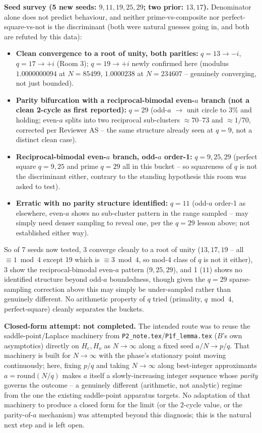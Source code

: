 \textbf{Seed survey (5 new seeds: $9,11,19,25,29$; two prior: $13,17$).} Denominator alone does
not predict behaviour, and neither prime-vs-composite nor perfect-square-vs-not is the
discriminant (both were natural guesses going in, and both are refuted by this data):
\begin{itemize}
\item \textbf{Clean convergence to a root of unity, both parities:} $q=13\to-i$, $q=17\to+i$
  (Room 3); $q=19\to+i$ newly confirmed here (modulus $1.0000000094$ at $N=85499$,
  $1.0000238$ at $N=234607$ -- genuinely converging, not just bounded).
\item \textbf{Parity bifurcation with a reciprocal-bimodal even-$a$ branch (not a clean
  2-cycle as first reported):} $q=29$ (odd-$a$ $\to$ unit circle to $3\%$ and holding; even-$a$
  splits into two reciprocal sub-clusters $\approx70$--$73$ and $\approx1/70$, corrected per
  Reviewer AS -- the same structure already seen at $q=9$, not a distinct clean case).
\item \textbf{Reciprocal-bimodal even-$a$ branch, odd-$a$ order-1:} $q=9,25,29$ (perfect
  square $q=9,25$ and prime $q=29$ all in this bucket -- so squareness of $q$ is not the
  discriminant either, contrary to the standing hypothesis this room was asked to test).
\item \textbf{Erratic with no parity structure identified:} $q=11$ (odd-$a$ order-1 as elsewhere,
  even-$a$ shows no sub-cluster pattern in the range sampled -- may simply need denser sampling to
  reveal one, per the $q=29$ lesson above; not established either way).
\end{itemize}
So of 7 seeds now tested, 3 converge cleanly to a root of unity ($13,17,19$ -- all $\equiv1\bmod4$
except 19 which is $\equiv3\bmod4$, so mod-4 class of $q$ is not it either), 3 show the
reciprocal-bimodal even-$a$ pattern ($9,25,29$), and 1 ($11$) shows no identified structure beyond
odd-$a$ boundedness, though given the $q=29$ sparse-sampling correction above this may simply be
under-sampled rather than genuinely different. No arithmetic property of $q$ tried (primality,
$q\bmod4$, perfect-square) cleanly separates the buckets.

\textbf{Closed-form attempt: not completed.} The intended route was to reuse the
saddle-point/Laplace machinery from \texttt{P2\_note.tex}/\texttt{P1f\_lemma.tex} ($B$'s own
asymptotics) directly on $H_e,H_o$ as $N\to\infty$ along a fixed seed $a/N\to p/q$. That
machinery is built for $N\to\infty$ with the phase's stationary point moving continuously; here,
fixing $p/q$ and taking $N\to\infty$ along best-integer approximants $a=\mathrm{round}(N/q)$
makes $a$ itself a slowly-increasing integer sequence whose \emph{parity} governs the outcome --
a genuinely different (arithmetic, not analytic) regime from the one the existing saddle-point
apparatus targets. No adaptation of that machinery to produce a closed form for the limit (or the
2-cycle value, or the parity-of-$a$ mechanism) was attempted beyond this diagnosis; this is the
natural next step and is left open.

